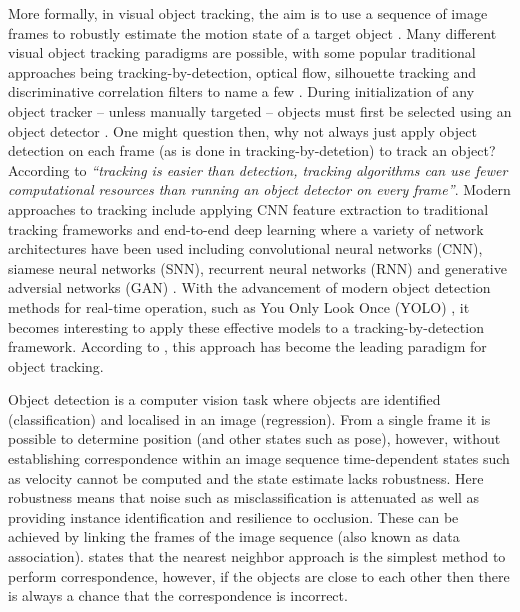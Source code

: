 \documentclass[a4paper,twoside,12pt]{report}
\begin{document}
More formally, in visual object tracking, the aim is to use a sequence of image frames to robustly estimate the motion state of a target object \citep{track1}. Many different visual object tracking paradigms are possible, with some popular traditional approaches being tracking-by-detection, optical flow, silhouette tracking and discriminative correlation filters to name a few \citep{track0}. During initialization of any object tracker -- unless manually targeted -- objects must first be selected using an object detector \citep{tradtrack0}. One might question then, why not always just apply object detection on each frame (as is done in tracking-by-detetion) to track an object? According to \cite{tradtrack5} \textit{``tracking is easier than detection, tracking algorithms can use fewer computational resources than running an object detector on every frame''}. Modern approaches to tracking include applying CNN feature extraction to traditional tracking frameworks and end-to-end deep learning where a variety of network architectures have been used including convolutional neural networks (CNN), siamese neural networks (SNN), recurrent neural networks (RNN) and generative adversial networks (GAN) \citep{deeptrack1}. With the advancement of modern object detection methods for real-time operation, such as You Only Look Once (YOLO) \citep{yolo}, it becomes interesting to apply these effective models to a tracking-by-detection framework. According to \cite{deepsort}, this approach has become the leading paradigm for object tracking.

Object detection is a computer vision task where objects are identified (classification) and localised in an image (regression). From a single frame it is possible to determine position (and other states such as pose), however, without establishing correspondence within an image sequence time-dependent states such as velocity cannot be computed and the state estimate lacks robustness. Here robustness means that noise such as misclassification is attenuated as well as providing instance identification and resilience to occlusion. These can be achieved by linking the frames of the image sequence (also known as data association). \cite{tradtrack0} states that the nearest neighbor approach is the simplest method to perform correspondence, however, if the objects are close to each other then there is always a chance that the correspondence is incorrect.
\end{document}
